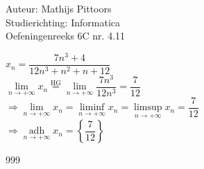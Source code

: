 \documentclass[a4paper]{article}
\newcommand{\llim}{\lim\limits}
\newcommand{\adh}{\underset{n\rightarrow+\infty}{\operatorname{adh}}}
\begin{document}
  
\noindent \large Auteur: Mathijs Pittoors \\
\noindent \large Studierichting: Informatica\\
\noindent \large Oefeningenreeks 6C nr. 4.11\\

\medskip

\normalsize

$x_n = \dfrac{7n^3+4}{12n^3+n^2+n+12}$\\

$\llim_{n\rightarrow+\infty} x_n \stackrel{\text{HG}}{=} \llim_{n\rightarrow+\infty} \dfrac{7n^3}{12n^3} = \dfrac{7}{12}$\\

$\Rightarrow \llim_{n\rightarrow+\infty} x_n = \liminf\limits_{n\rightarrow+\infty} x_n = \limsup\limits_{n\rightarrow+\infty} x_n = \dfrac{7}{12}$\\

$\Rightarrow \adh x_n = \left\{\dfrac{7}{12}\right\}$


\begin{thebibliography}{999}
\end{thebibliography}
\end{document}
